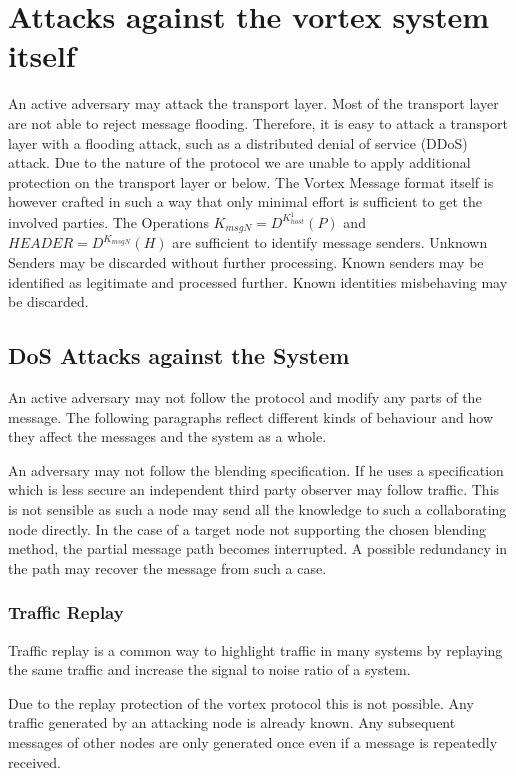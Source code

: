 \section{Attacks against the vortex system itself}
An active adversary may attack the transport layer. Most of the transport layer are not able to reject message flooding. Therefore, it is easy to attack a transport layer with a flooding attack, such as a distributed denial of service (DDoS) attack. Due to the nature of the protocol we are unable to apply additional protection on the transport layer or below. The Vortex Message format itself is however crafted in such a way that only minimal effort is sufficient to get the involved parties. The Operations $ K_{msgN}=D^{K^{1}_{host}}\left(P\right)$ and $HEADER=D^{K_{msgN}}\left(H\right)$ are sufficient to identify message senders. Unknown Senders may be discarded without further processing. Known senders may be identified as legitimate and processed further. Known identities misbehaving may be discarded.


\subsection{DoS Attacks against the System}
An active adversary may not follow the protocol and modify any parts of the message. The following paragraphs reflect different kinds of behaviour and how they affect the messages and the system as a whole.

An adversary may not follow the blending specification. If he uses a specification which is less secure an independent third party observer may follow traffic. This is not sensible as such a node may send all the knowledge to such a collaborating node directly. In the case of a  target node not supporting the chosen blending method, the partial message path becomes interrupted. A possible redundancy in the path may recover the message from such a case.

\subsubsection{Traffic Replay}
Traffic replay is a common way to highlight traffic in many systems by replaying the same traffic and increase the signal to noise ratio of a system. 

Due to the replay protection of the vortex protocol this is not possible. Any traffic generated by an attacking node is already known. Any subsequent messages of other nodes are only generated once even if a message is repeatedly received.

